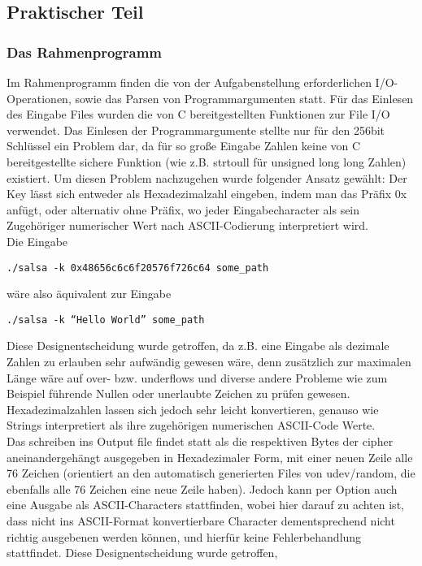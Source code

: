 \documentclass[course=erap]{aspdoc}
\begin{document}
\subsection{Praktischer Teil}
\subsubsection{Das Rahmenprogramm}
Im Rahmenprogramm finden die von der Aufgabenstellung erforderlichen I/O-Operationen, sowie das Parsen von Programmargumenten statt.
Für das Einlesen des Eingabe Files wurden die von C bereitgestellten Funktionen zur File I/O verwendet. Das Einlesen der Programmargumente stellte nur für den 256bit Schlüssel
ein Problem dar, da für so große Eingabe Zahlen keine von C bereitgestellte sichere Funktion (wie z.B. strtoull für unsigned long long Zahlen) existiert.
Um diesen Problem nachzugehen wurde folgender Ansatz gewählt:
Der Key lässt sich entweder als Hexadezimalzahl eingeben, indem man das Präfix 0x anfügt, oder alternativ ohne Präfix, wo jeder Eingabecharacter als sein Zugehöriger numerischer Wert
nach ASCII-Codierung interpretiert wird.
\\Die Eingabe 
\begin{center}
  \texttt{./salsa -k 0x48656c6c6f20576f726c64  some\_path}
\end{center} 
wäre also äquivalent zur Eingabe
\begin{center}
   \texttt{./salsa -k ``Hello World'' some\_path}
\end{center}
Diese Designentscheidung wurde getroffen, da z.B. eine Eingabe als dezimale Zahlen zu erlauben sehr aufwändig gewesen wäre, denn zusätzlich zur maximalen Länge wäre auf over- bzw. underflows und diverse andere Probleme wie zum
Beispiel führende Nullen oder unerlaubte Zeichen zu prüfen gewesen. Hexadezimalzahlen lassen sich jedoch sehr leicht konvertieren, genauso wie Strings interpretiert als ihre zugehörigen numerischen ASCII-Code Werte.
\\Das schreiben ins Output file findet statt als die respektiven Bytes der cipher aneinandergehängt ausgegeben in Hexadezimaler Form, mit einer neuen Zeile alle 76 Zeichen (orientiert an den automatisch generierten Files von udev/random, die ebenfalls alle 76 Zeichen eine neue Zeile haben).
Jedoch kann per Option auch eine Ausgabe als ASCII-Characters stattfinden, wobei hier darauf zu achten ist, dass nicht ins ASCII-Format konvertierbare Character dementsprechend nicht richtig ausgebenen werden können, und hierfür keine Fehlerbehandlung stattfindet. Diese Designentscheidung wurde getroffen, 
\end{document}
